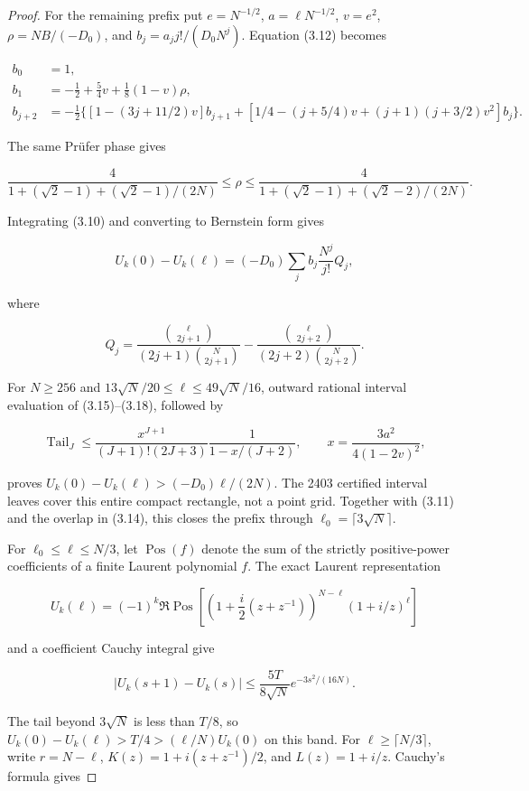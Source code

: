\documentclass[11pt]{article}
\begin{document}
\begin{proof}
For the remaining prefix put $e=N^{-1/2}$, $a=\ell N^{-1/2}$,
$v=e^2$, $\rho=NB/(-D_0)$, and
$b_j=a_jj!/(D_0N^j)$.  Equation (3.12) becomes

\[
\begin{aligned}
b_0&=1,\\
b_1&=-\frac12+\frac54v+\frac18(1-v)\rho,\\
b_{j+2}&=-\frac12\{[1-(3j+11/2)v]b_{j+1}
 +[1/4-(j+5/4)v+(j+1)(j+3/2)v^2]b_j\}.
\end{aligned} \tag{3.15}
\]

The same Prüfer phase gives

\[
\frac4{1+(\sqrt2-1)+(\sqrt2-1)/(2N)}
\le\rho\le
\frac4{1+(\sqrt2-1)+(\sqrt2-2)/(2N)}. \tag{3.16}
\]

Integrating (3.10) and converting to Bernstein form gives

\[
U_k(0)-U_k(\ell)=(-D_0)\sum_jb_j\frac{N^j}{j!}Q_j, \tag{3.17}
\]

where

\[
Q_j=\frac{\binom\ell{2j+1}}{(2j+1)\binom N{2j+1}}
-\frac{\binom\ell{2j+2}}{(2j+2)\binom N{2j+2}}. \tag{3.18}
\]

For $N\ge256$ and
$13\sqrt N/20\le\ell\le49\sqrt N/16$, outward rational interval
evaluation of (3.15)--(3.18), followed by

\[
\operatorname{Tail}_J\le
\frac{x^{J+1}}{(J+1)!(2J+3)}\frac1{1-x/(J+2)},
\qquad x=\frac{3a^2}{4(1-2v)^2}, \tag{3.19}
\]

proves $U_k(0)-U_k(\ell)>(-D_0)\ell/(2N)$.  The 2403
certified interval leaves cover this entire compact rectangle, not a point grid.
Together with (3.11) and the overlap in (3.14), this closes the prefix through
$\ell_0=\lceil3\sqrt N\rceil$.

For $\ell_0\le\ell\le N/3$, let $\operatorname{Pos}(f)$ denote the
sum of the strictly positive-power coefficients of a finite Laurent polynomial
$f$.  The exact Laurent representation

\[
U_k(\ell)=(-1)^k\Re\operatorname{Pos}
\left[\left(1+\frac{i}{2}(z+z^{-1})\right)^{N-\ell}
(1+i/z)^\ell\right] \tag{3.20}
\]

and a coefficient Cauchy integral give

\[
|U_k(s+1)-U_k(s)|
\le\frac{5T}{8\sqrt N}e^{-3s^2/(16N)}. \tag{3.21}
\]

The tail beyond $3\sqrt N$ is less than $T/8$, so
$U_k(0)-U_k(\ell)>T/4>(\ell/N)U_k(0)$ on this band.  For
$\ell\ge\lceil N/3\rceil$, write $r=N-\ell$,
$K(z)=1+i(z+z^{-1})/2$, and $L(z)=1+i/z$.  Cauchy's formula gives


\end{proof}
\end{document}
